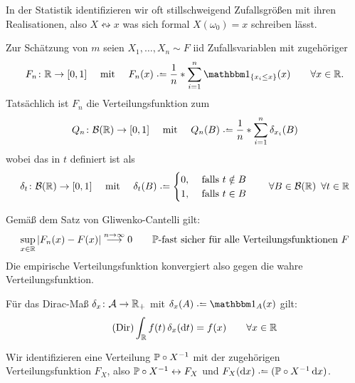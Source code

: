 	In der Statistik identifizieren wir oft stillschweigend Zufallsgrößen mit ihren Realisationen, also $X \leftrightsquigarrow x$ was sich formal $X(\omega_0) = x$ schreiben lässt.

Zur Schätzung von $m$ seien $X_1,\dots, X_n \sim F$ iid Zufallsvariablen mit zugehöriger 
\begin{equation*}
	F_n \colon \R \to [0,1] 
	\quad \text{ mit } \quad
	F_n(x) \defeq \frac{1}{n} * \sum_{i=1}^n \one_{\menge{ x_i \le x}}(x) \qquad \forall x \in \R.
\end{equation*}
Tatsächlich ist $F_n$ die Verteilungsfunktion zum 
\begin{equation*}
	Q_n \colon \borel\R \to [0,1]
	\quad \text{ mit } \quad
	Q_n(B)\defeq\frac{1}{n}*\sum_{i=1}^n\delta_{x_i}(B)
\end{equation*}
wobei das  in $t$ definiert ist als
\begin{equation*}
	\delta_t \colon \borel\R \to [0,1]
	\quad \text{ mit } \quad
	\delta_t(B) \defeq
	\begin{cases}
		0, &\falls t \notin B \\
		1, &\falls t \in B
	\end{cases}
	\qquad\forall B \in \borel\R \enskip \forall t \in \R
\end{equation*}

Gemäß dem Satz von Gliwenko-Cantelli gilt:
\begin{equation*}
	\sup_{x \in \R} \abs{F_n(x)-F(x)} \overset{n \to \infty}{\longrightarrow} 0 \qquad \P\text{-fast sicher für alle Verteilungsfunktionen } F
\end{equation*}
Die empirische Verteilungsfunktion konvergiert also gegen die wahre Verteilungsfunktion.

\begin{*erinnerung}
	Für das Dirac-Maß $\delta_x \colon \A \to \R_+$ mit $\delta_x(A) \defeq \one_A(x)$ gilt:
	\begin{equation}\label{eq: dirac} \tag{Dir}
		\int_\R f(t) \, \delta_x(\diff{t}) = f(x) \qquad \forall x \in \R
	\end{equation}
\end{*erinnerung}

\begin{*notation}
	Wir identifizieren eine Verteilung $\P\circ X^{-1}$ mit der zugehörigen Verteilungsfunktion $F_X$, also $\P \circ X^{-1} \leftrightarrow F_X$ und $F_X(\dx) \defeq (\P\circ X^{-1} \, \dx)$.
\end{*notation}

